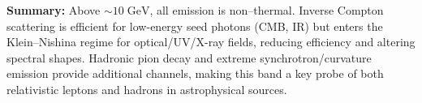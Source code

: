 \begin{remark}
    \textbf{Summary:} Above $\sim 10\;\mathrm{GeV}$, all emission is
    non--thermal. Inverse Compton scattering is efficient for low-energy
    seed photons (CMB, IR) but enters the Klein--Nishina regime for
    optical/UV/X-ray fields, reducing efficiency and altering spectral
    shapes. Hadronic pion decay and extreme synchrotron/curvature
    emission provide additional channels, making this band a key probe
    of both relativistic leptons and hadrons in astrophysical sources.
\end{remark}

